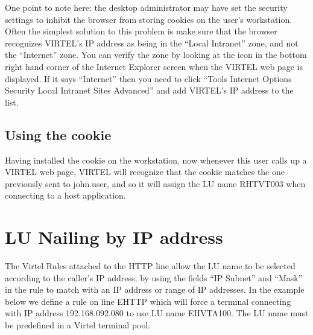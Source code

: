 \documentclass[letterpaper,10pt,english]{sphinxmanual}
\begin{document}
\sphinxAtStartPar
One point to note here: the desktop administrator may have set the security settings to inhibit the browser from storing cookies on the user’s workstation.  Often the simplest solution to this problem is make sure that the browser recognizes VIRTEL’s IP address as being in the “Local Intranet” zone, and not the “Internet” zone.  You can verify the zone by looking at the icon in the bottom right hand corner of the Internet Explorer screen when the VIRTEL web page is displayed.  If it says “Internet” then you need to click “Tools \sphinxhyphen{} Internet Options \sphinxhyphen{} Security \sphinxhyphen{} Local Intranet \sphinxhyphen{} Sites \textendash{} Advanced” and add VIRTEL’s IP address to the list.


\subsection{Using the cookie}
\label{\detokenize{connectivity_guide:using-the-cookie}}
\sphinxAtStartPar
Having installed the cookie on the workstation, now whenever this user calls up a VIRTEL web page, VIRTEL will recognize that the cookie matches the one previously sent to john.user, and so it will assign the LU name RHTVT003 when connecting to a host application.

\newpage

\ignorespaces 

\section{LU Nailing by IP address}
\label{\detokenize{connectivity_guide:lu-nailing-by-ip-address}}\label{\detokenize{connectivity_guide:index-154}}
\sphinxAtStartPar
The Virtel Rules attached to the HTTP line allow the LU name to be selected according to the caller’s IP address, by using the fields “IP Subnet” and “Mask” in the rule to match with an IP address or range of IP addresses. In the example below we define a rule on line E\sphinxhyphen{}HTTP which will force a terminal connecting with IP address 192.168.092.080 to use LU name EHVTA100. The LU name must be pre\sphinxhyphen{}defined in a Virtel terminal pool.

\sphinxAtStartPar
{}
\end{document}
